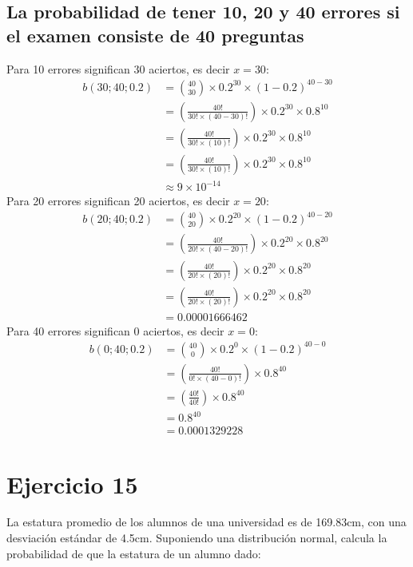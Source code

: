\documentclass[12pt]{article}
\begin{document}
\subsection{La probabilidad de tener 10, 20 y 40 errores si el examen consiste de 40 preguntas}
Para 10 errores significan 30 aciertos, es decir $x=30$:\\
\begin{equation}
\begin{split}
b(30;40;0.2)&={40\choose 30} \times 0.2^{30} \times (1 - 0.2)^{40-30}\\
&=(\frac{40!}{30!\times(40-30)!}) \times 0.2^{30} \times 0.8^{10}\\
&=(\frac{40!}{30!\times(10)!}) \times 0.2^{30} \times 0.8^{10}\\
&=(\frac{40!}{30!\times(10)!}) \times 0.2^{30} \times 0.8^{10}\\
&\approx 9 \times 10^{-14}
\end{split} 
\end{equation}
Para 20 errores significan 20 aciertos, es decir $x=20$:\\
\begin{equation}
\begin{split}
b(20;40;0.2)&={40\choose 20} \times 0.2^{20} \times (1 - 0.2)^{40-20}\\
&=(\frac{40!}{20!\times(40-20)!}) \times 0.2^{20} \times 0.8^{20}\\
&=(\frac{40!}{20!\times(20)!}) \times 0.2^{20} \times 0.8^{20}\\
&=(\frac{40!}{20!\times(20)!}) \times 0.2^{20} \times 0.8^{20}\\
&= 0.00001666462
\end{split} 
\end{equation}
Para 40 errores significan 0 aciertos, es decir $x=0$:\\
\begin{equation}
\begin{split}
b(0;40;0.2)&={40\choose 0} \times 0.2^{0} \times (1 - 0.2)^{40-0}\\
&=(\frac{40!}{0!\times(40-0)!}) \times 0.8^{40}\\
&=(\frac{40!}{40!}) \times 0.8^{40}\\
&= 0.8^{40}\\
&= 0.0001329228
\end{split} 
\end{equation}
\section{Ejercicio 15}
La estatura promedio de los alumnos de una universidad es de 169.83cm, con una desviación
estándar de 4.5cm. Suponiendo una distribución normal, calcula la probabilidad de que la
estatura de un alumno dado:
\end{document}
